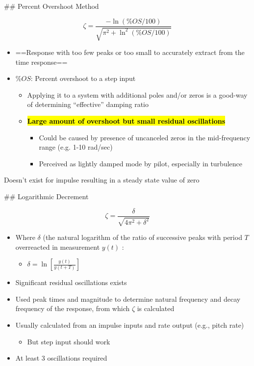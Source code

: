 \documentclass[10pt]{report}
\begin{document}
\#\# Percent Overshoot Method


$$\zeta = \frac{-\ln(\%OS/100)}{\sqrt{\pi^2 + \ln^2(\%OS/100)}}$$

\begin{itemize}
\item ==Response with too few peaks or too small to accurately extract from the time response==
\item $\%OS$: Percent overshoot to a step input

\begin{itemize}
\item Applying it to a system with additional poles and/or zeros is a good-way of determining “effective” damping ratio

\item \textbf{\hl{Large amount of overshoot but small residual oscillations}}

\begin{itemize}
\item Could be caused by presence of uncanceled zeros in the mid-frequency range (e.g. 1-10 rad/sec)

\item Perceived as lightly damped mode by pilot, especially in turbulence 

\end{itemize}
\end{itemize}
\end{itemize}

\begin{advtcolorbox}
Doesn’t exist for impulse resulting in a steady state value of zero 

\end{advtcolorbox}

\#\# Logarithmic Decrement

$$\zeta = \frac{\delta}{\sqrt{4\pi^2 + \delta^2}}$$

\begin{itemize}
\item Where $\delta$ (the natural logarithm of the ratio of successive peaks with period $T$ overreacted in measurement $y(t)$ :
\begin{itemize}
\item $\delta = \ln\left[\frac{y(t)}{y(t+T)}\right]$

\end{itemize}
\item Significant residual oscillations exists

\item Used peak times and magnitude to determine natural frequency and decay frequency of the response, from which $\zeta$ is calculated

\item Usually calculated from an impulse inputs and rate output (e.g., pitch rate)

\begin{itemize}
\item But step input should work

\end{itemize}
\item At least 3 oscillations required

\end{itemize}
\end{document}
